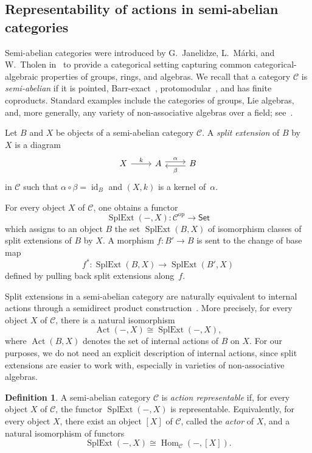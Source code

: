 \documentclass[reqno,a4paper]{amsart}
\theoremstyle{plain}
\theoremstyle{definition}
\newtheorem{definition}[subsection]{Definition}
\theoremstyle{remark}
\numberwithin{equation}{section}
\newcommand{\cC}{\ensuremath{\mathcal{C}}}
\DeclareMathOperator{\op}{op}
\DeclareMathOperator{\Act}{Act}
\DeclareMathOperator{\Hom}{Hom}
\DeclareMathOperator{\SplExt}{SplExt}
\DeclareMathOperator{\id}{id}
\newcommand{\Set}{\ensuremath{\mathsf{Set}}}
\begin{document}
\subsection{Representability of actions in semi-abelian categories}\label{SecActions}

Semi-abelian categories were introduced by G.~Janelidze, L.~Márki, and W.~Tholen in~\cite{Semi-Ab} to provide a categorical setting capturing common categorical-algebraic properties of groups, rings, and algebras. We recall that a category $\cC$ is \emph{semi-abelian} if it is pointed, Barr-exact~\cite{Barr}, protomodular~\cite{Bourn}, and has finite coproducts. Standard examples include the categories of groups, Lie algebras, and, more generally, any variety of non-associative algebras over a field; see~\cite[Theorem~9.5]{VdL-NAA}.

Let $B$ and $X$ be objects of a semi-abelian category $\cC$. A \emph{split extension} of $B$ by~$X$ is a diagram
\begin{equation}\label{eq:split_extension}
\begin{tikzcd}
X \arrow[r, "k"]
&
A \arrow[r, shift left, "\alpha"]
&
B \arrow[l, shift left, "\beta"]
\end{tikzcd}
\end{equation}
in $\cC$ such that $\alpha\circ\beta=\id_B$ and $(X,k)$ is a kernel of~$\alpha$.

For every object $X$ of $\cC$, one obtains a functor
\[
\SplExt(-,X)\colon\cC^{\op}\to\Set
\]
which assigns to an object $B$ the set $\SplExt(B,X)$ of isomorphism classes of split extensions of $B$ by $X$. A morphism $f\colon B'\to B$ is sent to the change of base map
\[
f^*\colon\SplExt(B,X)\to\SplExt(B',X)
\]
defined by pulling back split extensions along~$f$.

Split extensions in a semi-abelian category are naturally equivalent to internal actions through a semidirect product construction~\cite{BJK}. More precisely, for every object $X$ of $\cC$, there is a natural isomorphism
\[
\Act(-,X)\cong\SplExt(-,X),
\]
where $\Act(B,X)$ denotes the set of internal actions of $B$ on $X$. For our purposes, we do not need an explicit description of internal actions, since split extensions are easier to work with, especially in varieties of non-associative algebras.

\begin{definition}\cite{BJK}
A semi-abelian category $\cC$ is \emph{action representable} if, for every object $X$ of $\cC$, the functor $\SplExt(-,X)$ is representable. Equivalently, for every object $X$, there exist an object $[X]$ of $\cC$, called the \emph{actor} of $X$, and a natural isomorphism of functors
\[
\SplExt(-,X)\cong\Hom_{\cC}(-,[X]).
\]
\end{definition}
\end{document}
